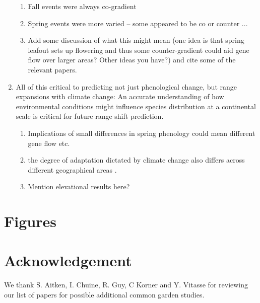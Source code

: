 \documentclass{article}
\begin{document}
\begin{enumerate}
\begin{enumerate}
\item Fall events were always co-gradient
\item Spring events were more varied -- some appeared to be co or counter ... 
\item Add some discussion of what this might mean (one idea is that spring leafout sets up flowering and thus some counter-gradient could aid gene flow over larger areas? Other ideas you have?) and cite some of the relevant papers. 
\end{enumerate}
\item All of this critical to predicting not just phenological change, but range expansions with climate change: An accurate understanding of how environmental conditions might influence species distribution at a continental scale is critical for future range shift prediction.
\begin{enumerate}
\item Implications of small differences in spring phenology could mean different gene flow etc. 
\item the degree of adaptation dictated by climate change also differs across different geographical areas \citep{Loarie09}. 
\item Mention elevational results here? 
\end{enumerate}
\end{enumerate}







\section{Figures}







\section{Acknowledgement}
We thank S. Aitken,  I. Chuine, R. Guy, C Korner and Y. Vitasse for reviewing our list of papers for possible additional common garden studies. 
\end{document}
